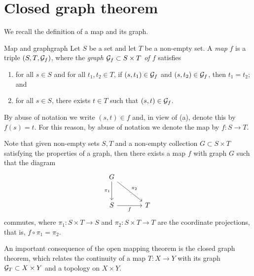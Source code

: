 \section{Closed graph theorem}
We recall the definition of a map and its graph.
\begin{definition}{Map and graph}{graph}
    Let \(S\) be a set and let \(T\) be a non-empty set. A \emph{map} \(f\) is a triple \((S, T, \mathcal{G}_{f})\), where the \emph{graph \(\mathcal{G}_{f} \subset S \times T\) of \(f\)} satisfies
    \begin{enumerate}[label=(\alph*)]
        \item for all \(s \in S\) and for all \(t_1, t_2 \in T\), if \((s, t_1) \in \mathcal{G}_{f}\) and \((s, t_2) \in \mathcal{G}_{f}\), then \(t_1 = t_2\); and
        \item for all \(s \in S\), there exists \(t \in T\) such that \((s, t) \in \mathcal{G}_{f}\).
    \end{enumerate}
    By abuse of notation we write \((s, t) \in f\) and, in view of (a), denote this by \(f(s) = t\). For this reason, by abuse of notation we denote the map by \(f : S \to T\).
\end{definition}
Note that given non-empty sets \(S, T\) and a non-empty collection \(G \subset S \times T\) satisfying the properties of a graph, then there exists a map \(f\) with graph \(G\) such that the diagram
\begin{equation*}
    \begin{tikzcd}[column sep = large, row sep = large]
        G \arrow{rd}{\pi_2} \arrow[swap]{d}{\pi_1} &\\
        S \arrow[swap]{r}{f} & T
    \end{tikzcd}
\end{equation*}
commutes, where \(\pi_1 : S \times T \to S\) and \(\pi_2 : S\times T \to T\) are the coordinate projections, that is, \(f \circ \pi_1 = \pi_2\).

An important consequence of the open mapping theorem is the closed graph theorem, which relates the continuity of a map \(T : X \to Y\) with its graph \(\mathcal{G}_{T}\subset X \times Y\) and a topology on \(X \times Y\).

